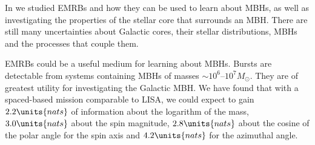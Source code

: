 In  we studied EMRBs and how they can be used to learn about MBHs, as well as investigating the properties of the stellar core that surrounds an MBH. There are still many uncertainties about Galactic cores, their stellar distributions, MBHs and the processes that couple them.

EMRBs could be a useful medium for learning about MBHs. Bursts are detectable from systems containing MBHs of masses $\sim 10^6$--$10^7 M_\odot$. They are of greatest utility for investigating the Galactic MBH. We have found that with a spaced-based mission comparable to LISA, we could expect to gain $2.2\units{nats}$ of information about the logarithm of the mass, $3.0\units{nats}$ about the spin magnitude, $2.8\units{nats}$ about the cosine of the polar angle for the spin axis and $4.2\units{nats}$ for the azimuthal angle.
